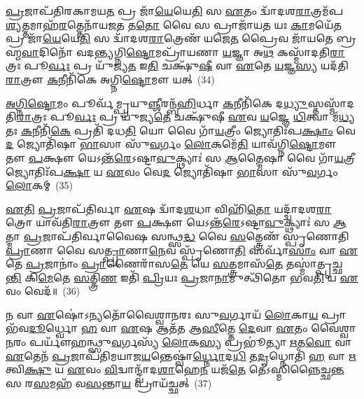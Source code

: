 \-\ul{𑌪𑍍𑌰}\-𑌜𑌾𑌪᳴𑌤𑌿𑌰𑌕𑌾𑌮𑌯\-\ul{𑌤} 𑌪𑍍𑌰 𑌜𑌾᳴\-\ul{𑌯𑍇}\-𑌯𑍇\-\ul{𑌤𑌿} 𑌸 \ul{𑌏}\-𑌤𑌂 𑌦𑍍𑌵𑌾᳴𑌦𑌶\-\ul{𑌰𑌾}\-𑌤𑍍𑌰𑌮᳴𑌪\-\ul{𑌶𑍍𑌯}\-𑌤𑍍𑌤𑌮𑌾𑌹᳴\-\ul{𑌰}\-𑌤𑍍𑌤𑍇𑌨𑌾᳴𑌯𑌜\-\ul{𑌤} 𑌤\-\ul{𑌤𑍋} 𑌵𑍈 𑌸 𑌪𑍍𑌰𑌾𑌜𑌾᳴𑌯\-\ul{𑌤} 𑌯𑌃 \ul{𑌕𑌾}\-𑌮𑌯𑍇᳴\-\ul{𑌤} 𑌪𑍍𑌰 𑌜𑌾᳴\-\ul{𑌯𑍇}\-𑌯𑍇\-\ul{𑌤𑌿} 𑌸 𑌦𑍍𑌵𑌾᳴𑌦𑌶\-\ul{𑌰𑌾}\-𑌤𑍍𑌰𑍇𑌣᳴ 𑌯𑌜𑍇\-\ul{𑌤} 𑌪𑍍𑌰𑍈𑌵 𑌜𑌾᳴𑌯𑌤𑍇 𑌬𑍍𑌰𑌹𑍍𑌮\-\ul{𑌵𑌾}\-𑌦𑌿𑌨𑍋᳴ 𑌵𑌦𑌨𑍍𑌤𑍍𑌯𑌗𑍍𑌨𑌿\-\ul{𑌷𑍍𑌟𑍋}\-𑌮𑌪𑍍𑌰𑌾᳴𑌯𑌣𑌾 \ul{𑌯}\-𑌜𑍍𑌞𑌾 𑌅\-\ul{𑌥} 𑌕𑌸𑍍𑌮𑌾᳴𑌦𑌤𑌿\-\ul{𑌰𑌾}\-𑌤𑍍𑌰𑌃 𑌪𑍂\-\ul{𑌰𑍍𑌵𑌃} 𑌪𑍍𑌰 𑌯𑍁᳴𑌜𑍍𑌯\-\ul{𑌤} 𑌇\-\ul{𑌤𑌿} 𑌚𑌕𑍍𑌷𑍁᳴\-\ul{𑌷𑍀} 𑌵𑌾 \ul{𑌏}\-𑌤𑍇 \ul{𑌯}\-𑌜𑍍𑌞\-\ul{𑌸𑍍𑌯} 𑌯𑌦᳴𑌤𑌿\-\ul{𑌰𑌾}\-𑌤𑍍𑌰𑍗 \ul{𑌕}\-𑌨𑍀𑌨𑌿᳴𑌕𑍇 𑌅𑌗𑍍𑌨𑌿\-\ul{𑌷𑍍𑌟𑍋}\-𑌮𑍗 𑌯𑌤𑍍~(34)

\-\ul{𑌅}\-\-\ul{𑌗𑍍𑌨𑌿}\-\-\ul{𑌷𑍍𑌟𑍋}\-𑌮𑌂 𑌪𑍂𑌰𑍍𑌵᳴𑌮𑍍𑌪𑍍𑌰𑌯𑍁\-\ul{𑌞𑍍𑌜𑍀}\-𑌰𑌨𑍍𑌬᳴\-\ul{𑌹𑌿}\-𑌰𑍍𑌧𑌾 \ul{𑌕}\-𑌨𑍀𑌨𑌿᳴𑌕𑍇 𑌦\-\ul{𑌧𑍍𑌯𑍁}\-𑌸𑍍𑌤𑌸𑍍𑌮𑌾᳴𑌦𑌤𑌿\-\ul{𑌰𑌾}\-𑌤𑍍𑌰𑌃 𑌪𑍂\-\ul{𑌰𑍍𑌵𑌃} 𑌪𑍍𑌰 𑌯𑍁᳴𑌜𑍍𑌯\-\ul{𑌤𑍇} 𑌚𑌕𑍍𑌷𑍁᳴𑌷𑍀 \ul{𑌏}\-𑌵 \ul{𑌯}\-𑌜𑍍𑌞𑍇 \ul{𑌧𑌿}\-𑌤𑍍𑌵𑌾 𑌮᳴\-\ul{𑌧𑍍𑌯}\-𑌤𑌃 \ul{𑌕}\-𑌨𑍀𑌨𑌿᳴\-\ul{𑌕𑍇} 𑌪𑍍𑌰𑌤𑌿᳴ 𑌦𑌧\-\ul{𑌤𑌿} 𑌯𑍋 𑌵𑍈 𑌗𑌾᳴\-\ul{𑌯}\-𑌤𑍍𑌰𑍀𑌂 𑌜𑍍𑌯𑍋𑌤𑌿𑌃᳴𑌪\-\ul{𑌕𑍍𑌷𑌾𑌂} 𑌵𑍇\-\ul{𑌦} 𑌜𑍍𑌯𑍋𑌤𑌿᳴𑌷𑌾 \ul{𑌭𑌾}\-𑌸𑌾 𑌸𑍁᳴\-\ul{𑌵}\-𑌰𑍍𑌗𑌂 \ul{𑌲𑍋}\-𑌕𑌮𑍇᳴\-\ul{𑌤𑌿} 𑌯𑌾𑌵᳴𑌗𑍍𑌨𑌿\-\ul{𑌷𑍍𑌟𑍋}\-𑌮𑍗 𑌤𑍗 \ul{𑌪}\-𑌕𑍍𑌷𑍗 𑌯𑍇\-𑌽𑌨𑍍𑌤᳴\-\ul{𑌰𑍇}\-\-𑌽𑌷𑍍𑌟𑌾\-\ul{𑌵𑍁}\-𑌕𑍍𑌥𑍍𑌯𑌾𑌃॑ 𑌸 \ul{𑌆}\-𑌤𑍍𑌮𑍈𑌷𑌾 𑌵𑍈 𑌗𑌾᳴\-\ul{𑌯}\-𑌤𑍍𑌰𑍀 𑌜𑍍𑌯𑍋𑌤𑌿𑌃᳴𑌪\-\ul{𑌕𑍍𑌷𑌾} 𑌯 \ul{𑌏}\-𑌵𑌂 𑌵𑍇\-\ul{𑌦} 𑌜𑍍𑌯𑍋𑌤𑌿᳴𑌷𑌾 \ul{𑌭𑌾}\-𑌸𑌾 𑌸𑍁᳴\-\ul{𑌵}\-𑌰𑍍𑌗𑌂 \ul{𑌲𑍋}\-𑌕𑌮𑍍~(35)

\-\ul{𑌏}\-\-\ul{𑌤𑌿} \ul{𑌪𑍍𑌰}\-𑌜𑌾𑌪᳴𑌤𑌿𑌰𑍍𑌵𑌾 \ul{𑌏}\-𑌷 𑌦𑍍𑌵𑌾᳴𑌦\-\ul{𑌶}\-𑌧𑌾 𑌵𑌿𑌹𑌿᳴\-\ul{𑌤𑍋} 𑌯𑌦𑍍𑌦𑍍𑌵𑌾᳴𑌦𑌶\-\ul{𑌰𑌾}\-𑌤𑍍𑌰𑍋 𑌯𑌾𑌵᳴𑌤𑌿\-\ul{𑌰𑌾}\-𑌤𑍍𑌰𑍗 𑌤𑍗 \ul{𑌪}\-𑌕𑍍𑌷𑍗 𑌯𑍇\-𑌽𑌨𑍍𑌤᳴\-\ul{𑌰𑍇}\-\-𑌽𑌷𑍍𑌟𑌾\-\ul{𑌵𑍁}\-𑌕𑍍𑌥𑍍𑌯𑌾𑌃॑ 𑌸 \ul{𑌆}\-𑌤𑍍𑌮𑌾 \ul{𑌪𑍍𑌰}\-𑌜𑌾𑌪᳴𑌤𑌿𑌰𑍍𑌵𑌾𑌵𑍈𑌷 𑌸𑌨𑍍𑌥𑍍𑌸\-\ul{𑌦𑍍𑌧} 𑌵𑍈 \ul{𑌸}\-𑌤𑍍𑌤𑍍𑌰𑍇𑌣᳴ 𑌸𑍍𑌪𑍃𑌣𑍋𑌤𑌿 \ul{𑌪𑍍𑌰𑌾}\-𑌣𑌾 𑌵𑍈 𑌸\-\ul{𑌤𑍍𑌪𑍍𑌰𑌾}\-𑌣𑌾\-\ul{𑌨𑍇}\-𑌵 𑌸𑍍𑌪𑍃᳴𑌣𑍋\-\ul{𑌤𑌿} 𑌸𑌰𑍍𑌵𑌾᳴\-\ul{𑌸𑌾𑌂} 𑌵𑌾 \ul{𑌏}\-𑌤𑍇 \ul{𑌪𑍍𑌰}\-𑌜𑌾𑌨𑌾𑌂॑ \ul{𑌪𑍍𑌰𑌾}\-𑌣𑍈𑌰𑌾᳴𑌸\-\ul{𑌤𑍇} 𑌯𑍇 \ul{𑌸}\-𑌤𑍍𑌤𑍍𑌰𑌮𑌾𑌸᳴\-\ul{𑌤𑍇} 𑌤𑌸𑍍𑌮𑌾॑𑌤𑍍𑌪𑍃𑌚𑍍𑌛\-\ul{𑌨𑍍𑌤𑌿} 𑌕𑌿\-\ul{𑌮𑍇}\-𑌤𑍇 \ul{𑌸}\-𑌤𑍍𑌤𑍍𑌰𑌿\-\ul{𑌣} 𑌇𑌤𑌿᳴ \ul{𑌪𑍍𑌰𑌿}\-𑌯𑌃 \ul{𑌪𑍍𑌰}\-𑌜𑌾\-\ul{𑌨𑌾}\-𑌮𑍁𑌤𑍍𑌥𑌿᳴𑌤𑍋 𑌭𑌵\-\ul{𑌤𑌿} 𑌯 \ul{𑌏}\-𑌵𑌂 𑌵𑍇𑌦᳴॥~(36)

{\anuvakamend[{\-\ul{𑌅}\-\-\ul{𑌗𑍍𑌨𑌿}\-\-\ul{𑌷𑍍𑌟𑍋}\-𑌮𑍗 𑌯𑌥𑍍𑌸𑍁᳴\-\ul{𑌵}\-𑌰𑍍𑌗\-\ul{𑌲𑍍𑌲𑍋𑌂}\-𑌕𑌂 \ul{𑌪𑍍𑌰𑌿}\-𑌯𑌃 \ul{𑌪𑍍𑌰}\-𑌜𑌾\-\ul{𑌨𑌾𑌂} 𑌪𑌞𑍍𑌚᳴ 𑌚}]}%

𑌨 𑌵𑌾 \ul{𑌏}\-𑌷𑍋॑\-𑌽𑌨𑍍𑌯𑌤𑍋᳴𑌵𑍈𑌶𑍍𑌵𑌾𑌨𑌰𑌃 𑌸𑍁\-\ul{𑌵}\-𑌰𑍍𑌗𑌾𑌯᳴ \ul{𑌲𑍋}\-𑌕𑌾\-\ul{𑌯} 𑌪𑍍𑌰𑌾𑌭᳴𑌵\-\ul{𑌦𑍂}\-𑌰𑍍𑌧𑍍𑌵𑍋 \ul{𑌹} 𑌵𑌾 \ul{𑌏}\-𑌷 𑌆𑌤᳴𑌤 𑌆\-\ul{𑌸𑍀}\-𑌤𑍍𑌤𑍇 \ul{𑌦𑍇}\-𑌵𑌾 \ul{𑌏}\-𑌤𑌂 𑌵𑍈॑𑌶𑍍𑌵𑌾\-\ul{𑌨}\-𑌰𑌂 𑌪𑌰𑍍𑌯𑍗᳴𑌹𑌨𑍍𑌥𑍍𑌸𑍁\-\ul{𑌵}\-𑌰𑍍𑌗𑌸𑍍𑌯᳴ \ul{𑌲𑍋}\-𑌕\-\ul{𑌸𑍍𑌯} 𑌪𑍍𑌰𑌭𑍂॑𑌤𑍍𑌯𑌾 \ul{𑌋}\-𑌤\-\ul{𑌵𑍋} 𑌵𑌾 \ul{𑌏}\-𑌤𑍇𑌨᳴ \ul{𑌪𑍍𑌰}\-𑌜𑌾𑌪᳴𑌤𑌿𑌮𑌯𑌾𑌜\-\ul{𑌯}\-𑌨𑍍𑌤𑍇𑌷𑍍𑌵𑌾॑\-\ul{𑌰𑍍𑌧𑍍𑌨𑍋}\-𑌦\-\ul{𑌧𑌿} 𑌤\-\ul{𑌦𑍃}\-𑌧𑍍𑌨𑍋𑌤𑌿᳴ \ul{𑌹} 𑌵𑌾 \ul{𑌋}\-𑌤𑍍𑌵𑌿\-\ul{𑌕𑍍𑌷𑍁} 𑌯 \ul{𑌏}\-𑌵𑌂 \ul{𑌵𑌿}\-𑌦𑍍𑌵𑌾𑌨𑍍𑌦𑍍𑌵𑌾᳴𑌦\-\ul{𑌶𑌾}\-𑌹𑍇\-\ul{𑌨} 𑌯𑌜᳴\-\ul{𑌤𑍇} 𑌤𑍇॑\-𑌽𑌸𑍍𑌮𑌿𑌨𑍍𑌨𑍈𑌚𑍍𑌛\-\ul{𑌨𑍍𑌤} 𑌸 𑌰\-\ul{𑌸}\-𑌮𑌹᳴ 𑌵\-\ul{𑌸}\-𑌨𑍍𑌤𑌾\-\ul{𑌯} 𑌪𑍍𑌰𑌾𑌯᳴𑌚𑍍𑌛𑌤𑍍~(37)

